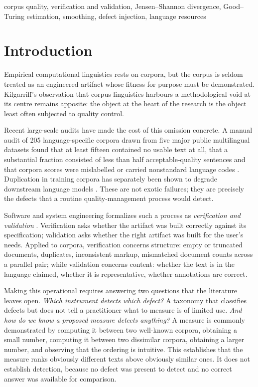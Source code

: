 \documentclass[conference]{IEEEtran}
\begin{document}
\begin{IEEEkeywords}
corpus quality, verification and validation, Jensen--Shannon divergence,
Good--Turing estimation, smoothing, defect injection, language resources
\end{IEEEkeywords}

\section{Introduction}

Empirical computational linguistics rests on corpora, but the corpus is seldom
treated as an engineered artifact whose fitness for purpose must be
demonstrated. Kilgarriff's observation that corpus linguistics harbours a
methodological void at its centre \cite{kilgarriff2001} remains apposite: the
object at the heart of the research is the object least often subjected to
quality control.

Recent large-scale audits have made the cost of this omission concrete. A manual
audit of 205 language-specific corpora drawn from five major public multilingual
datasets found that at least fifteen contained no usable text at all, that a
substantial fraction consisted of less than half acceptable-quality sentences 
and that corpora scores were mislabelled or carried nonstandard language
codes \cite{kreutzer2022}. Duplication in training corpora has separately been
shown to degrade downstream language models \cite{lee2022dedup}. These are not
exotic failures; they are precisely the defects that a routine quality-management
process would detect.

Software and system engineering formalizes such a process as \emph{verification
and validation} \cite{boehm1984,ieee1012}. Verification asks whether the artifact
was built correctly against its specification; validation asks whether the right
artifact was built for the user's needs. Applied to corpora, verification
concerns structure: empty or truncated documents, duplicates, inconsistent
markup, mismatched document counts across a parallel pair; while validation
concerns content: whether the text is in the language claimed, whether it is
representative, whether annotations are correct.

Making this operational requires answering two questions that the literature
leaves open. \emph{Which instrument detects which defect?} A taxonomy that
classifies defects but does not tell a practitioner what to measure is of limited
use. \emph{And how do we know a proposed measure detects anything?} A measure is
commonly demonstrated by computing it between two well-known corpora, obtaining a
small number, computing it between two dissimilar corpora, obtaining a larger
number, and observing that the ordering is intuitive. This establishes that the
measure ranks obviously different texts above obviously similar ones. It does not
establish detection, because no defect was present to detect and no correct
answer was available for comparison.
\end{document}
